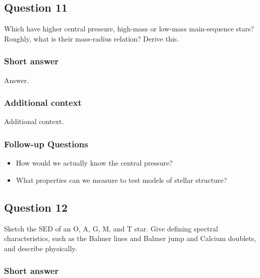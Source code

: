 \documentclass[a4paper,10pt]{article}
\begin{document}

\newpage
\subsection{Question 11}

Which have higher central pressure, high-mass or low-mass main-sequence stars? Roughly, what is their mass-radius relation? Derive this.

\subsubsection{Short answer}

Answer.

\subsubsection{Additional context}

Additional context.
\subsubsection{Follow-up Questions}

\begin{itemize}
    \item How would we actually know the central pressure?
    \item What properties can we measure to test models of stellar structure?
\end{itemize}


\newpage
\subsection{Question 12}

Sketch the SED of an O, A, G, M, and T star. Give defining spectral characteristics, such as the Balmer lines and Balmer jump and Calcium doublets, and describe physically.

\subsubsection{Short answer}
\end{document}

